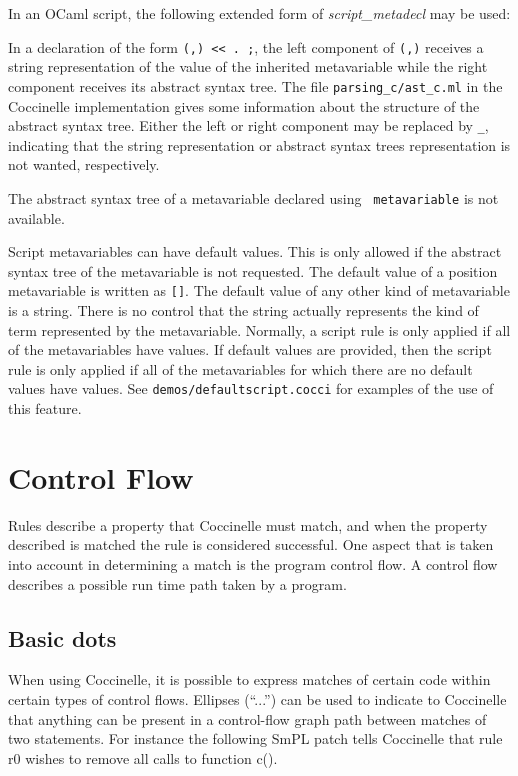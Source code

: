 In an OCaml script, the following extended form of \textit{script\_metadecl}
may be used:

\begin{grammar}
\end{grammar}

\noindent
In a declaration of the form \texttt{(,) <{}<
  . ;}, the left component of \texttt{(,)}
receives a string representation of the value of the inherited metavariable
while the right component receives its abstract syntax tree.  The file
\texttt{parsing\_c/ast\_c.ml} in the Coccinelle implementation gives some
information about the structure of the abstract syntax tree.  Either the
left or right component may be replaced by \verb+_+, indicating that the
string representation or abstract syntax trees representation is not
wanted, respectively.

The abstract syntax tree of a metavariable declared using {\tt
  metavariable} is not available.

Script metavariables can have default values.  This is only allowed if the
abstract syntax tree of the metavariable is not requested.  The default
value of a position metavariable is written as {\tt []}.  The default value
of any other kind of metavariable is a string.  There is no control that
the string actually represents the kind of term represented by the
metavariable.  Normally, a script rule is only applied if all of the
metavariables have values.  If default values are provided, then the script
rule is only applied if all of the metavariables for which there are no
default values have values.  See {\tt demos/defaultscript.cocci} for examples of
the use of this feature.

\section{Control Flow}

Rules describe a property that Coccinelle must match, and when the
property described is matched the rule is considered successful. One aspect
that is taken into account in determining a match is the program control
flow. A control flow describes a possible run time path taken by a program.

\subsection{Basic dots}
When using Coccinelle, it is possible to express matches of certain code
within certain types of control flows. Ellipses (``...'') can be used to
indicate to Coccinelle that anything can be present in a control-flow graph
path between matches of two
statements. For instance the following SmPL patch tells Coccinelle that
rule r0 wishes to remove all calls to function c().


